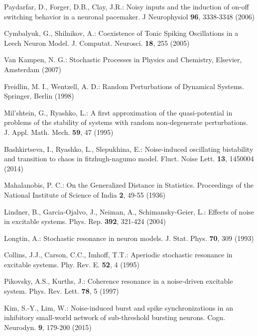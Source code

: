 \begin{thebibliography}{00}

 Paydarfar, D., Forger, D.B., Clay, J.R.:  Noisy inputs and the
induction of on-off switching behavior in a neuronal pacemaker.
J Neurophysiol \textbf{96}, 3338-3348 (2006)

 Cymbalyuk, G., Shilnikov, A.: Coexistence of Tonic 
Spiking Oscillations in a Leech Neuron Model.
J. Computat. Neurosci. \textbf{18}, 255 (2005)

 Van Kampen, N. G.: Stochastic Processes in Physics and
Chemistry, Elsevier, Amsterdam (2007)

  Freidlin, M. I.,  Wentzell, A. D.: Random Perturbations of
Dynamical Systems. Springer, Berlin (1998)

  Mil'shtein, G., Ryashko, L.: A first approximation of the quasi-potential in problems 
of the stability of systems with random non-degenerate perturbations.
J. Appl. Math. Mech. \textbf{59}, 47 (1995)

 Bashkirtseva, I., Ryashko, L., Slepukhina, E.: Noise-induced 
oscillating bistability and transition to chaos in fitzhugh-nagumo model. Fluct. Noise
Lett. \textbf{13}, 1450004 (2014)

  Mahalanobis, P. C.: On the Generalized Distance in Statistics. 
Proceedings of the National Institute of Science of India \textbf{2}, 49-55 (1936)

 Lindner, B., Garcia-Ojalvo, J., Neiman, A., Schimansky-Geier, L.: 
Effects of noise in excitable systems. Phys. Rep. \textbf{392}, 321-424 (2004)

 Longtin, A.: Stochastic resonance in neuron
models. J. Stat. Phys. \textbf{70}, 309 (1993)

 Collins, J.J., Carson, C.C., Imhoff, T.T.: Aperiodic stochastic 
resonance in excitable systems. Phy. Rev. E. \textbf {52}, 4 (1995)

 Pikovsky, A.S., Kurths, J.: Coherence resonance in a noise-driven excitable
system. Phys. Rev. Lett. \textbf{78}, 5 (1997)

 Kim, S.-Y., Lim, W.: Noise-induced burst and spike synchronizations in an inhibitory
small-world network of sub-threshold bursting neurons. Cogn. Neurodyn. \textbf{9}, 179-200 (2015)


\end{thebibliography}
